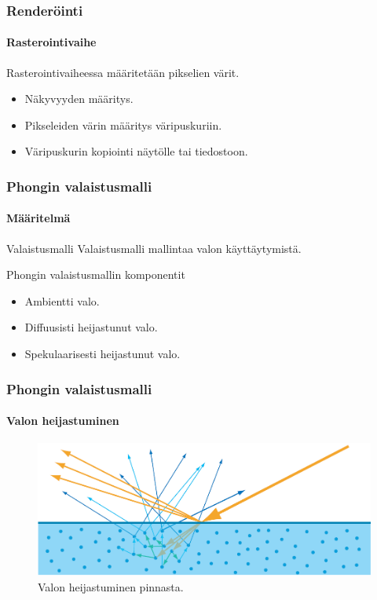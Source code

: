 \documentclass{beamer}
\begin{document}
\begin{frame}
\frametitle{Renderöinti}
\framesubtitle{Rasterointivaihe}
Rasterointivaiheessa määritetään pikselien värit.
\begin{itemize}
\item Näkyvyyden määritys.
\item Pikseleiden värin määritys väripuskuriin.
\item Väripuskurin kopiointi näytölle tai tiedostoon.
\end{itemize}
\end{frame}

\begin{frame}
\frametitle{Phongin valaistusmalli}
\framesubtitle{Määritelmä}
\begin{block}{Valaistusmalli}
Valaistusmalli mallintaa valon käyttäytymistä.
\end{block}
\begin{block}{Phongin valaistusmallin komponentit}
\begin{itemize}
\item Ambientti valo.
\item Diffuusisti heijastunut valo.
\item Spekulaarisesti heijastunut valo.
\end{itemize}
\end{block}
\end{frame}

\begin{frame}
\frametitle{Phongin valaistusmalli}
\framesubtitle{Valon heijastuminen}
\begin{figure}
\includegraphics[scale=0.3]{img/reflections.png}
\caption{Valon heijastuminen pinnasta.~\cite{Moller}}
\end{figure}
\end{frame}
\end{document}
